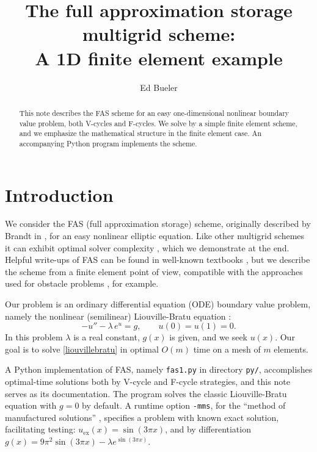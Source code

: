 \documentclass[letterpaper,final,12pt,reqno]{amsart}
\begin{document}
\title[The FAS multigrid scheme]{The full approximation storage multigrid scheme: \\ A 1D finite element example}

\author{Ed Bueler}

\begin{abstract}  This note describes the FAS scheme for an easy one-dimensional nonlinear boundary value problem, both V-cycles and F-cycles.  We solve by a simple finite element scheme, and we emphasize the  mathematical structure in the finite element case.  An accompanying Python program implements the scheme.
\end{abstract}

\maketitle

\thispagestyle{empty}
\bigskip

\section{Introduction}  \label{sec:intro}

We consider the FAS (full approximation storage) scheme, originally described by Brandt in \cite{Brandt1977}, for an easy nonlinear elliptic equation.  Like other multigrid schemes it can exhibit optimal solver complexity \cite{Bueler2021}, which we demonstrate at the end.  Helpful write-ups of FAS can be found in well-known textbooks \cite{BrandtLivne2011,Briggsetal2000,Trottenbergetal2001}, but we describe the scheme from a finite element point of view, compatible with the approaches used for obstacle problems \cite{GraeserKornhuber2009}, for example.

Our problem is an ordinary differential equation (ODE) boundary value problem, namely the nonlinear (semilinear) Liouville-Bratu equation \cite{Bratu1914,Liouville1853}:
\begin{equation}
  -u'' - \lambda\, e^u = g,  \qquad u(0) = u(1) = 0.  \label{liouvillebratu}
\end{equation}
In this problem $\lambda$ is a real constant, $g(x)$ is given, and we seek $u(x)$.  Our goal is to solve \eqref{liouvillebratu} in optimal $O(m)$ time on a mesh of $m$ elements.

A Python implementation of FAS, namely \texttt{fas1.py} in directory \texttt{py/}, accomplishes optimal-time solutions both by V-cycle and F-cycle strategies, and this note serves as its documentation.  The program solves the classic Liouville-Bratu equation with $g=0$ by default.  A runtime option \texttt{-mms}, for the ``method of manufactured solutions'' \cite{Bueler2021}, specifies a problem with known exact solution, facilitating testing: $u_{\text{ex}}(x)=\sin(3\pi x)$, and by differentiation $g(x)=9\pi^2 \sin(3\pi x) - \lambda e^{\sin(3\pi x)}$.
\end{document}
